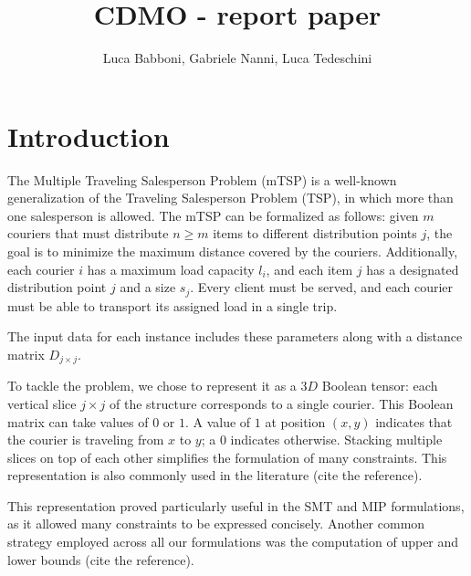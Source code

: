 \documentclass{article}
\title{CDMO - report paper}
\author{Luca Babboni, Gabriele Nanni, Luca Tedeschini}
\begin{document}
\maketitle


\section{Introduction}
The Multiple Traveling Salesperson Problem (mTSP) is a well-known generalization of the Traveling Salesperson Problem (TSP), in which more than one salesperson is allowed. The mTSP can be formalized as follows: given \( m \) couriers that must distribute \( n \geq m \) items to different distribution points \( j \), the goal is to minimize the maximum distance covered by the couriers. Additionally, each courier \( i \) has a maximum load capacity \( l_i \), and each item \( j \) has a designated distribution point \( j \) and a size \( s_j \). Every client must be served, and each courier must be able to transport its assigned load in a single trip.  

The input data for each instance includes these parameters along with a distance matrix \( D_{j \times j} \).  

To tackle the problem, we chose to represent it as a \( 3D \) Boolean tensor: each vertical slice \( j \times j \) of the structure corresponds to a single courier. This Boolean matrix can take values of \( 0 \) or \( 1 \). A value of \( 1 \) at position \( (x, y) \) indicates that the courier is traveling from \( x \) to \( y \); a \( 0 \) indicates otherwise. Stacking multiple slices on top of each other simplifies the formulation of many constraints. This representation is also commonly used in the literature (cite the reference).  

This representation proved particularly useful in the SMT and MIP formulations, as it allowed many constraints to be expressed concisely. Another common strategy employed across all our formulations was the computation of upper and lower bounds (cite the reference).  
\end{document}
